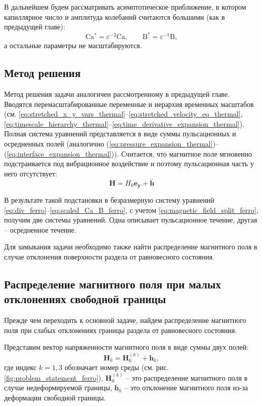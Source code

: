 \documentclass[12pt,a4paper]{article}
\begin{document}
В дальнейшем будем рассматривать асимптотическое приближение, в котором капиллярное число и амплитуда колебаний считаются большими (как в предыдущей главе):
\begin{equation}\label{eq:scaled_Ca_B_ferro}
	\mathrm{Ca^*}=\varepsilon^{-2}\mathrm{Ca},\qquad
	\mathrm{B^*}=\varepsilon^{-1}\mathrm{B},
\end{equation}
а остальные параметры не масштабируются.

\subsection{Метод решения}

Метод решения задачи аналогичен рассмотренному в предыдущей главе. Вводятся перемасштабированные переменные и иерархия временных масштабов (см. \eqref{eq:stretched_x_y_vars_thermal}--\eqref{eq:stretched_velocity_eq_thermal}, \eqref{eq:timescale_hierarchy_thermal}--\eqref{eq:time_derivative_expansion_thermal}). Полная система уравнений представляется в виде суммы пульсационных и осредненных полей (аналогично (\ref{eq:pressure_expansion_thermal})--(\ref{eq:interface_expansion_thermal})).
Считается, что магнитное поле мгновенно подстраивается под
вибрационное воздействие и поэтому пульсационная часть у него отсутствует:
\begin{equation}\label{eq:magnetic_field_split_ferro}
	\mathbf{H} = H_0 \mathbf{e_y} + \bar{ \mathbf{h}}
\end{equation}

В результате такой подстановки в безразмерную систему уравнений \eqref{eq:div_ferro}--\eqref{eq:scaled_Ca_B_ferro}, с учетом \eqref{eq:magnetic_field_split_ferro}, получим две системы уравнений. Одна описывает пульсационное течение, другая -- осредненное течение. 

Для замыкания задачи необходимо также найти распределение магнитного поля в случае отклонения поверхности раздела от равновесного состояния. 

\subsection{Распределение магнитного поля при малых отклонениях свободной границы} \label{sec:magnetic_field}

Прежде чем переходить к основной задаче, найдем распределение магнитного поля при слабых отклонениях границы раздела от равновесного состояния. 

Представим вектор напряженности магнитного поля в виде суммы двух полей:
\[
\mathbf{H}_k = \mathbf{H}_0^{(k)} + \overline{\mathbf{h}_k},
\]
где индекс $k=1,3$ обозначает номер среды (см. рис. \ref{fig:problem_statement_ferro}), $\mathbf{H}_0^{(k)}$ -- это распределение магнитного поля в случае недеформируемой границы,
$\overline{\mathbf{h}}_k$ -- это отклонение магнитного поля из-за деформации свободной границы.  
\end{document}
